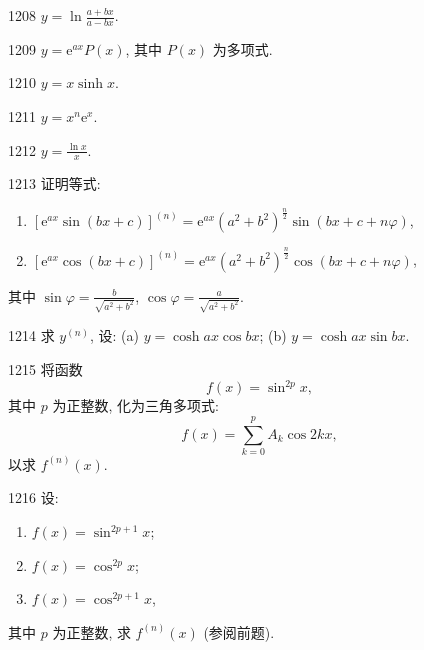 \begin{prob}[S]{1208}
$y = \ln\frac{a + bx}{a - bx}$.
\end{prob}

\begin{prob}[S]{1209}
$y = \mathrm{e}^{ax} P(x)$, 其中 $P(x)$ 为多项式.
\end{prob}

\begin{prob}[S]{1210}
$y = x\sinh x$.
\end{prob}


\begin{prob}[S]{1211}
$y = x^n\mathrm{e}^x$.
\end{prob}

\begin{prob}[S]{1212}
$y = \frac{\ln x}{x}$.
\end{prob}

\begin{prob}[L]{1213}
证明等式:
\begin{enumerate}[label=(\arabic*), itemsep=2pt, topsep=3pt]
  \item $[\mathrm{e}^{ax}\sin(bx + c)]^{(n)} = \mathrm{e}^{ax}(a^2 + b^2)^{\frac{n}{2}}\sin(bx + c + n\varphi)$,
  \item $[\mathrm{e}^{ax}\cos(bx + c)]^{(n)} = \mathrm{e}^{ax}(a^2 + b^2)^{\frac{n}{2}}\cos(bx + c + n\varphi)$,
\end{enumerate}
其中 $\sin\varphi = \frac{b}{\sqrt{a^2 + b^2}}$, $\cos\varphi = \frac{a}{\sqrt{a^2 + b^2}}$.
\end{prob}

\begin{prob}[M]{1214}
求 $y^{(n)}$, 设:
(a) $y = \cosh ax\cos bx$; \qquad (b) $y = \cosh ax\sin bx$.
\end{prob}

\begin{prob}[L]{1215}
将函数
\[
f(x) = \sin^{2p} x,
\]
其中 $p$ 为正整数, 化为三角多项式:
\[
f(x) = \sum_{k=0}^{p} A_k\cos 2kx,
\]
以求 $f^{(n)}(x)$.
\end{prob}

\begin{prob}[L]{1216}
设:
\begin{enumerate}[label=(\alph*), itemsep=2pt, topsep=3pt]
  \item $f(x) = \sin^{2p+1} x$;
  \item $f(x) = \cos^{2p} x$;
  \item $f(x) = \cos^{2p+1} x$,
\end{enumerate}
其中 $p$ 为正整数, 求 $f^{(n)}(x)$ (参阅前题).
\end{prob}

